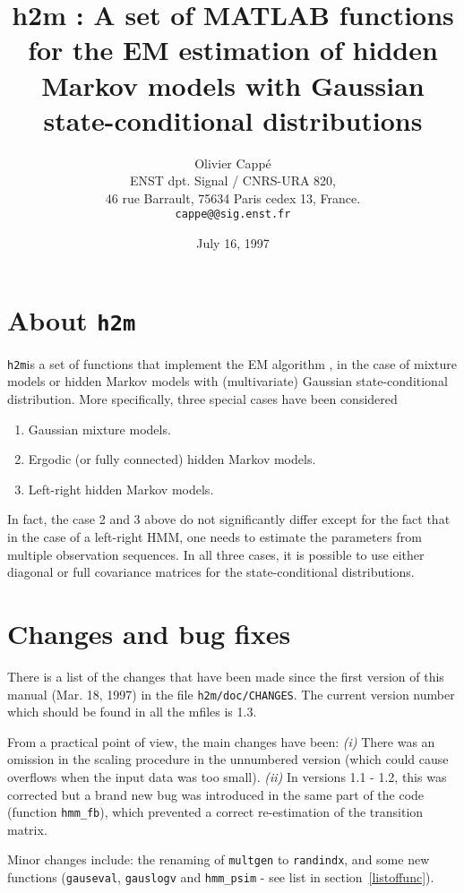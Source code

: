 \documentclass[a4paper,11pt]{article}
\title{h2m : A set of MATLAB functions for the EM estimation of hidden Markov models with Gaussian state-conditional distributions}
\author{Olivier Capp\'{e}\\
ENST dpt. Signal / CNRS-URA 820,\\
46 rue Barrault, 75634 Paris cedex 13, France.\\
{\tt cappe@@sig.enst.fr}}
\date{July 16, 1997}
\newcommand{\hmm}{{\tt h2m}}
\begin{document}
\maketitle
\tableofcontents

\section{About \hmm}
\hmm is a set of functions that implement the EM algorithm \cite{Dempster:EM}, \cite{Wu:EM} in the case of mixture models or hidden Markov models with (multivariate) Gaussian state-conditional distribution. More specifically, three special cases have been considered
\begin{enumerate}
\item Gaussian mixture models.
\item Ergodic (or fully connected) hidden Markov models.
\item Left-right hidden Markov models.
\end{enumerate}
In fact, the case 2 and 3 above do not significantly differ except for the fact that in the case of a left-right HMM, one needs to estimate the parameters from multiple observation sequences. In all three cases, it is possible to use either diagonal or full covariance matrices for the state-conditional distributions.

\section{Changes and bug fixes}
There is a list of the changes that have been made since the first version of this manual (Mar. 18, 1997) in the file {\tt h2m/doc/CHANGES}. The current version number which should be found in all the mfiles is 1.3.

From a practical point of view, the main changes have been: {\em (i)} There was an omission in the scaling procedure in the unnumbered version (which could cause overflows when the input data was too small). {\em (ii)} In versions 1.1 - 1.2, this was corrected but a brand new bug was introduced in the same part of the code (function {\tt hmm\_fb}), which prevented a correct re-estimation of the transition matrix.

Minor changes include: the renaming of {\tt multgen} to {\tt randindx}, and some new functions ({\tt gauseval}, {\tt gauslogv} and {\tt hmm\_psim} - see list in section~\ref{listoffunc}). 
\end{document}
